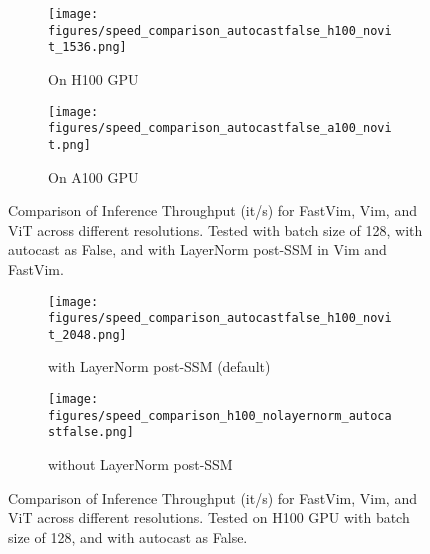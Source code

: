 \begin{figure*}[!h]
    \centering
    \begin{subfigure}[b]{0.49\textwidth}
        \centering
        \texttt{[image: figures/speed\_comparison\_autocastfalse\_h100\_novit\_1536.png]}
        \caption{On H100 GPU}
    \end{subfigure}
    \begin{subfigure}[b]{0.49\textwidth}
        \centering
        \texttt{[image: figures/speed\_comparison\_autocastfalse\_a100\_novit.png]}
        \caption{On A100 GPU}
    \end{subfigure}
    \caption{Comparison of Inference Throughput (it/s) for FastVim, Vim, and ViT across different resolutions. Tested with batch size of 128, with autocast as False, and with LayerNorm post-SSM in Vim and FastVim.}
    \label{fig:throughput_a100}
\end{figure*}







\begin{figure*}[!h]
    \centering
    \begin{subfigure}[b]{0.49\textwidth}
        \centering
        \texttt{[image: figures/speed\_comparison\_autocastfalse\_h100\_novit\_2048.png]}
        \caption{with LayerNorm post-SSM (default)}
        \label{fig:throughput_tiny}
    \end{subfigure}
    \begin{subfigure}[b]{0.49\textwidth}
        \centering
        \texttt{[image: figures/speed\_comparison\_h100\_nolayernorm\_autocastfalse.png]}
        \caption{without LayerNorm post-SSM}
        \label{fig:throughput_base}
    \end{subfigure}
    \caption{Comparison of Inference Throughput (it/s) for FastVim, Vim, and ViT across different resolutions. Tested on H100 GPU with batch size of 128, and with autocast as False.}
    \label{fig:throughput_nolayernorm}
\end{figure*}


